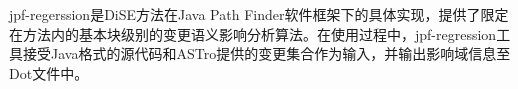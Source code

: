 %
%
%
%
%
%
%
%
%

jpf-regerssion是DiSE方法在Java Path Finder软件框架下的具体实现，提供了限定在方法内的基本块级别的变更语义影响分析算法。在使用过程中，jpf-regression工具接受Java格式的源代码和ASTro提供的变更集合作为输入，并输出影响域信息至Dot文件中。

